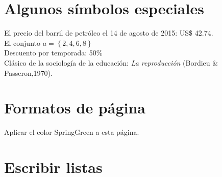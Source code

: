 \documentclass[12pt,a4paper]{article}
\begin{document}
\section{Algunos símbolos especiales}

\noindent El precio del barril de petróleo el 14 de agosto de 2015:
US\$ 42.74.\\
El conjunto $a=\left\{2,4,6,8\right\}$\\
Descuento por temporada: 50\%\\
Clásico de la sociología de la educación: \textit{La reproducción}
(Bordieu \& Passeron,1970).
\pagebreak

\section{Formatos de página}

\pagecolor{LimeGreen}
Aplicar el color SpringGreen a esta página.

\section{Escribir listas}
\end{document}
